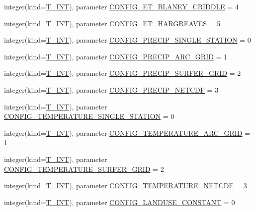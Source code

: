 \begin{DoxyCompactItemize}
\item 
integer(kind=\hyperlink{namespacetest_a6f91ebd89b58cfcc5da99faed9385c1e}{T\_\-INT}), parameter \hyperlink{namespacetest_a30e48e6d5352a9d7b9f80946248ac7c7}{CONFIG\_\-ET\_\-BLANEY\_\-CRIDDLE} = 4
\item 
integer(kind=\hyperlink{namespacetest_a6f91ebd89b58cfcc5da99faed9385c1e}{T\_\-INT}), parameter \hyperlink{namespacetest_a7eb680c826f6ef864ae366e97076e482}{CONFIG\_\-ET\_\-HARGREAVES} = 5
\item 
integer(kind=\hyperlink{namespacetest_a6f91ebd89b58cfcc5da99faed9385c1e}{T\_\-INT}), parameter \hyperlink{namespacetest_a21c652de204eff57b4a764e644f1c2d6}{CONFIG\_\-PRECIP\_\-SINGLE\_\-STATION} = 0
\item 
integer(kind=\hyperlink{namespacetest_a6f91ebd89b58cfcc5da99faed9385c1e}{T\_\-INT}), parameter \hyperlink{namespacetest_a2b72dfa965e7c91b8b844dfda4430890}{CONFIG\_\-PRECIP\_\-ARC\_\-GRID} = 1
\item 
integer(kind=\hyperlink{namespacetest_a6f91ebd89b58cfcc5da99faed9385c1e}{T\_\-INT}), parameter \hyperlink{namespacetest_a5cd862c804720044203e177379939919}{CONFIG\_\-PRECIP\_\-SURFER\_\-GRID} = 2
\item 
integer(kind=\hyperlink{namespacetest_a6f91ebd89b58cfcc5da99faed9385c1e}{T\_\-INT}), parameter \hyperlink{namespacetest_aabfd0fd8168bc7f0d7a8e12b40776c4e}{CONFIG\_\-PRECIP\_\-NETCDF} = 3
\item 
integer(kind=\hyperlink{namespacetest_a6f91ebd89b58cfcc5da99faed9385c1e}{T\_\-INT}), parameter \hyperlink{namespacetest_ae5b28f5f9060952cfc4b6dd836f27bb1}{CONFIG\_\-TEMPERATURE\_\-SINGLE\_\-STATION} = 0
\item 
integer(kind=\hyperlink{namespacetest_a6f91ebd89b58cfcc5da99faed9385c1e}{T\_\-INT}), parameter \hyperlink{namespacetest_a608c6b33ac0a09611c41b079eb5a4608}{CONFIG\_\-TEMPERATURE\_\-ARC\_\-GRID} = 1
\item 
integer(kind=\hyperlink{namespacetest_a6f91ebd89b58cfcc5da99faed9385c1e}{T\_\-INT}), parameter \hyperlink{namespacetest_a474c230f779edba10f9928cfc29d3a9b}{CONFIG\_\-TEMPERATURE\_\-SURFER\_\-GRID} = 2
\item 
integer(kind=\hyperlink{namespacetest_a6f91ebd89b58cfcc5da99faed9385c1e}{T\_\-INT}), parameter \hyperlink{namespacetest_afbea0dcb66b0963f92f65620b40b4d85}{CONFIG\_\-TEMPERATURE\_\-NETCDF} = 3
\item 
integer(kind=\hyperlink{namespacetest_a6f91ebd89b58cfcc5da99faed9385c1e}{T\_\-INT}), parameter \hyperlink{namespacetest_aee066d92ba29f5a5855e38b1ec0bf25b}{CONFIG\_\-LANDUSE\_\-CONSTANT} = 0

\end{DoxyCompactItemize}
